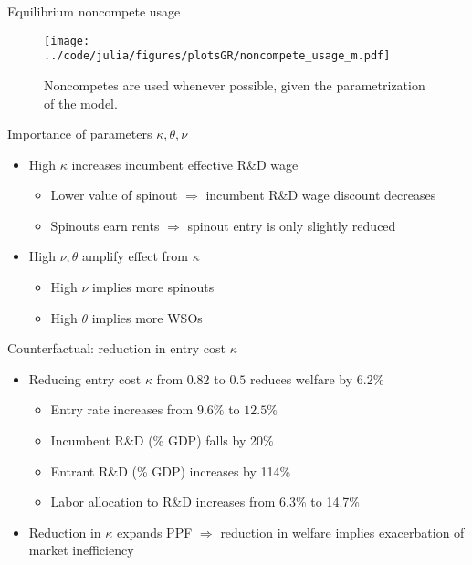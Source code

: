 \documentclass[english,usenames,dvipsnames]{beamer}
\begin{document}
\begin{frame}{Equilibrium noncompete usage}
\begin{figure}
	\centering
	\texttt{[image: ../code/julia/figures/plotsGR/noncompete\_usage\_m.pdf]}
	\caption{Noncompetes are used whenever possible, given the parametrization of the model.}
\end{figure}
\end{frame}




\begin{frame}{Importance of parameters $\kappa,\theta,\nu$}
\begin{itemize}
	\item High $\kappa$ increases incumbent effective R\&D wage
	\begin{itemize}
		\item Lower value of spinout $\Rightarrow$ incumbent R\&D wage discount decreases
		\item Spinouts earn rents $\Rightarrow$ spinout entry is only slightly reduced
	\end{itemize}
	\item High $\nu , \theta$ amplify effect from $\kappa$
	\begin{itemize}
		\item High $\nu$ implies more spinouts
		\item High $\theta$ implies more WSOs
	\end{itemize}
\end{itemize}
\end{frame}

\begin{frame}{Counterfactual: reduction in entry cost $\kappa$}
\begin{itemize}
	\item Reducing entry cost $\kappa$ from $0.82$ to $0.5$ reduces welfare by 6.2\%
	\begin{itemize}
		\item Entry rate increases from $9.6\%$ to $12.5\%$
		\item Incumbent R\&D (\% GDP) falls by 20\%
		\item Entrant R\&D (\% GDP) increases by 114\%
		\item Labor allocation to R\&D increases from 6.3\% to 14.7\%
	\end{itemize}
	\item Reduction in $\kappa$ expands PPF $\Rightarrow$ reduction in welfare implies exacerbation of market inefficiency 
\end{itemize}
\end{frame}
\end{document}
